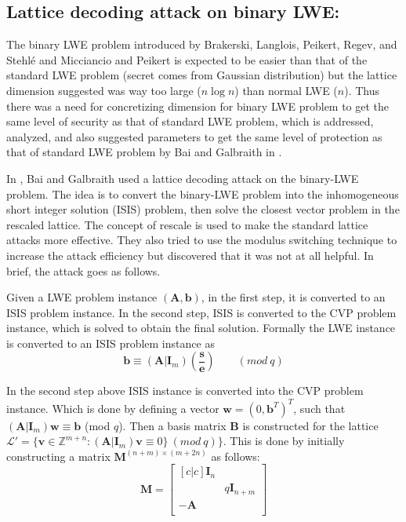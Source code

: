 \subsection{Lattice decoding attack on binary LWE:}
\label{sec:Galbraith_decoding}
The binary LWE problem introduced by Brakerski, Langlois, Peikert, Regev, and Stehl\'e \cite{brakerski2013classical} and Micciancio and Peikert \cite{micciancio2013hardness} is expected to be easier than that of the standard LWE problem (secret comes from Gaussian distribution) but the lattice dimension suggested was way too large ($n\log{n}$) than normal LWE ($n$). Thus there was a need for concretizing dimension for binary LWE problem to get the same level of security as that of standard LWE problem, which is addressed, analyzed, and also suggested parameters to get the same level of protection as that of standard LWE problem by Bai and Galbraith in \cite{bai2014lattice}.

In \cite{bai2014lattice}, Bai and Galbraith used a lattice decoding attack on the binary-LWE problem. The idea is to convert the binary-LWE problem into the inhomogeneous short integer solution (ISIS) problem, then solve the closest vector problem in the rescaled lattice. The concept of rescale is used to make the standard lattice attacks more effective. They also tried to use the modulus switching technique to increase the attack efficiency but discovered that it was not at all helpful. In brief, the attack goes as follows.

Given a LWE problem instance $(\pmb{A},\pmb{b})$, in the first step, it is converted to an ISIS problem instance. In the second step, ISIS is converted to the CVP problem instance, which is solved to obtain the final solution. Formally the LWE instance is converted to an ISIS problem instance as
\begin{equation*}
    \pmb{b} \equiv (\pmb{A}|\pmb{I}_m) (\frac{\pmb{s}}{\pmb{e}}) \hspace{2em} (mod\ q)
\end{equation*}

In the second step above ISIS instance is converted into the CVP problem instance. Which is done by defining a vector $\pmb{w}=(0,\pmb{b}^T)^T$, such that $(\pmb{A}|\pmb{I}_m)\pmb{w} \equiv \pmb{b}$ (mod $q$). Then a basis matrix $\pmb{B}$ is constructed for the lattice
$\mathcal{L}'=\{\pmb{v} \in \mathbb{Z}^{m+n}: (\pmb{A}|\pmb{I}_m)\pmb{v} \equiv 0 \} \ (mod\ q)\}$. This is done by initially constructing a matrix $\pmb{M}^{(n+m)\times(m+2n)}$ as follows:
\begin{equation*}
    \pmb{M}=
    \begin{bmatrix}[c|c]
        \pmb{I}_n &                \\
                  & q\pmb{I}_{n+m} \\
        -\pmb{A}  &                \\
    \end{bmatrix}
\end{equation*}

